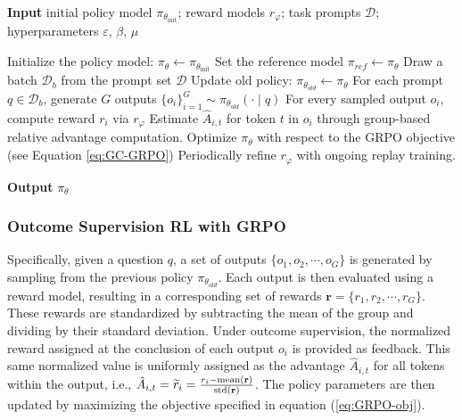 \begin{itemize}[topsep=0pt]
\begin{algorithm}[t]
  \small
  \caption{Iterative Group Relative Policy Optimization}
  \textbf{Input} initial policy model $\pi_{\theta_{\text{init}}}$; reward models $r_\varphi$; task prompts $\mathcal{D}$; 
  hyperparameters $\varepsilon$, $\beta$, $\mu$
  \begin{algorithmic}[1]
    \State Initialize the policy model: $\pi_\theta \leftarrow \pi_{\theta_{\text{init}}}$
       \State Set the reference model $\pi_{ref} \leftarrow \pi_{\theta}$
      \State Draw a batch $\mathcal{D}_b$ from the prompt set $\mathcal{D}$
      \State Update old policy: $\pi_{\theta_{old}} \leftarrow \pi_{\theta}$
      \State For each prompt $q \in \mathcal{D}_b$, generate $G$ outputs $\{o_i\}_{i=1}^G \sim \pi_{\theta_{old}} (\cdot \mid q) $
      \State For every sampled output $o_i$, compute reward $r_i$ via $r_{\varphi}$
      \State Estimate $\hat{A}_{i,t}$ for token $t$ in $o_i$ through group-based relative advantage computation.
        \State Optimize $\pi_\theta$ with respect to the GRPO objective (see Equation \ref{eq:GC-GRPO})
      \EndFor
    \EndFor
    \State Periodically refine $r_\varphi$ with ongoing replay training. 
    \EndFor 
  \end{algorithmic}
  \textbf{Output} $\pi_\theta$
  \label{alg:iter-grpo}
\end{algorithm}

\subsubsection{Outcome Supervision RL with GRPO} Specifically, given a question $q$, a set of outputs $\{o_1, o_2, \cdots, o_G\}$ is generated by sampling from the previous policy $\pi_{\theta_{old}}$. Each output is then evaluated using a reward model, resulting in a corresponding set of rewards $\mathbf{r} = \{r_1, r_2, \cdots, r_G\}$. These rewards are standardized by subtracting the mean of the group and dividing by their standard deviation. Under outcome supervision, the normalized reward assigned at the conclusion of each output $o_i$ is provided as feedback. This same normalized value is uniformly assigned as the advantage $\hat{A}_{i, t}$ for all tokens within the output, i.e., $\hat{A}_{i, t} = \widetilde{r}_i = \frac{r_i- {\rm mean}(\mathbf{r})}{{\rm std}(\mathbf{r})}$. The policy parameters are then updated by maximizing the objective specified in equation (\ref{eq:GRPO-obj}).


\end{itemize}

